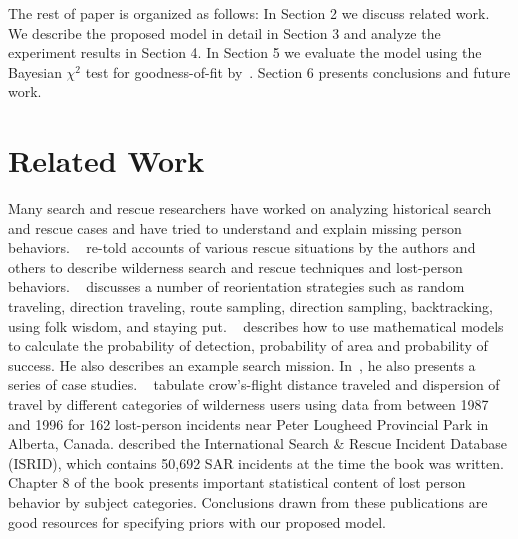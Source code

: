 The rest of paper is organized as follows: In Section 2 we discuss related work. We describe the proposed model in detail in Section 3 and analyze the experiment results in Section 4. In Section 5 we evaluate the model using the Bayesian $\chi^2$ test for goodness-of-fit by~\cite{Johnson2004Bayesian}. Section 6 presents conclusions and future work.

\section{Related Work}
\label{sec:2}

Many search and rescue researchers have worked on analyzing historical search and rescue cases and have tried to understand and explain missing person behaviors. ~\cite{Setnicka1980Wilderness} re-told accounts of various rescue situations by the authors and others to describe wilderness search and rescue techniques and lost-person behaviors. ~\cite{Hill1998Lost} discusses a number of reorientation strategies such as random traveling, direction traveling, route sampling, direction sampling, backtracking, using folk wisdom, and staying put. ~\cite{Syrotuck2000Introduction} describes how to use mathematical models to calculate the probability of detection, probability of area and probability of success. He also describes an example search mission. In~\cite{Syrotuck2000Analysis}, he also presents a series of case studies. ~\cite{Heth1998Characteristics} tabulate crow's-flight distance traveled and dispersion of travel by different categories of wilderness users using data from between 1987 and 1996 for 162 lost-person incidents near Peter Lougheed Provincial Park in Alberta, Canada. \cite{Koester2008Lost} described the International Search \& Rescue Incident Database (ISRID), which contains 50,692 SAR incidents at the time the book was written. Chapter 8 of the book presents important statistical content of lost person behavior by subject categories. Conclusions drawn from these publications are good resources for specifying priors with our proposed model.

